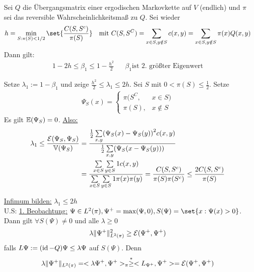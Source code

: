 \begin{satz}
	Sei $Q$ die Übergangsmatrix einer ergodischen Markovkette auf $V$ (endlich) und $\pi$ sei das reversible Wahrscheinlichkeitsmaß zu $Q$. Sei wieder 
	\begin{align}
		h = \min\limits_{S:\pi(S)<1/2} \set{\frac{C(S,S^c)}{\pi(S)}} && \text{mit } C(S,S^C) = \sum\limits_{x \in S, y \notin S} c(x,y) = \sum\limits_{x \in S, y \notin S} \pi(x) Q(x,y)
	\end{align}
	Dann gilt:
	\begin{align}
		1-2h \leq \beta_1 \leq 1-\frac{h^2}{2} && \beta_1 \text{ist 2. größter Eigenwert}
	\end{align}
\end{satz}
\begin{beweis}
	Setze $\lambda_1 := 1 - \beta_1$ und zeige $\frac{h^2}{2} \leq \lambda_1 \leq 2h$. Sei $S$ mit $0 < \pi(S) \leq \frac{1}{2}$. Setze
	\begin{align}
		\Psi_S(x) = \begin{cases}
						\pi(S^C, & x\in S) \\
						\pi(S), & x \notin S
					\end{cases}
	\end{align}
	Es gilt $\EW{\Psi_S} = 0$. \underline{Also:}
	\begin{align}
		\lambda_1 \leq \frac{\mathcal{E}(\Psi_S,\Psi_S)}{\Var{\Psi_S}} &= \frac{\frac{1}{2}\sum\limits_{x,y}\enb{\Psi_S(x) - \Psi_S(y)}^2 c(x,y)}{\frac{1}{2} \sum\limits_{x,y} \enb{\Psi_S(x - \Psi_S(y))}} \\
							&= \frac{\sum\limits_{x\in S} \sum\limits_{y \in S} 1 c(x,y) }{\sum\limits_{x \in S}\sum\limits_{y \in S} 1 \pi(x) \pi(y) } = \frac{C(S,S^c)}{\pi(S) \pi(S^c)} \leq \frac{2C(S,S^c)}{\pi(S)}
	\end{align}

	\underline{Infimum bilden:} $\lambda_1 \leq 2h$ \\
	U.S: \underline{1. Beobachtung:} $\Psi \in L^2(\pi), \Psi^+ = \max(\Psi,0),	S(\Psi) = \set{ x : \Psi (x) > 0 }$. Dann gilt $\forall S(\Psi) \neq 0$ und alle $\lambda \geq 0$
	\begin{align}
		\lambda \lVert\Psi^+\rVert^2_{L^2(\pi)} \geq \mathcal{E} (\Psi^+,\Psi^+)
	\end{align}
	falls $L\Psi := (\operatorname{id} - Q) \Psi \leq \lambda\Psi$ auf $S(\Psi)$. Denn
	\begin{align}
		\lambda \lVert\Psi^+\rVert_{L^2(\pi)} = < \lambda\Psi^+, \Psi^+>_{\pi} \overset{*}{\geq} <L_{\Psi^+}, \Psi^+ > = \mathcal{E} (\Psi^+,\Psi^+)
	\end{align}


\end{beweis}
